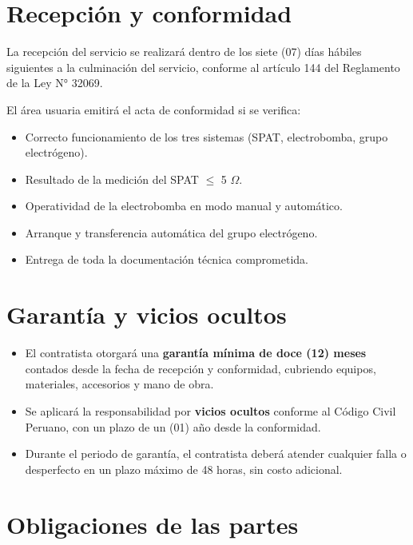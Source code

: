 \documentclass[12pt,a4paper]{article}
\begin{document}
\section{Recepción y conformidad}

La recepción del servicio se realizará dentro de los siete (07) días hábiles siguientes a la culminación del servicio, conforme al artículo 144 del Reglamento de la Ley N° 32069.

El área usuaria emitirá el acta de conformidad si se verifica:

\begin{itemize}
  \item Correcto funcionamiento de los tres sistemas (SPAT, electrobomba, grupo electrógeno).
  \item Resultado de la medición del SPAT $\leq$ 5 $\Omega$.
  \item Operatividad de la electrobomba en modo manual y automático.
  \item Arranque y transferencia automática del grupo electrógeno.
  \item Entrega de toda la documentación técnica comprometida.
\end{itemize}

\section{Garantía y vicios ocultos}

\begin{itemize}
  \item El contratista otorgará una \textbf{garantía mínima de doce (12) meses} contados desde la fecha de recepción y conformidad, cubriendo equipos, materiales, accesorios y mano de obra.
  \item Se aplicará la responsabilidad por \textbf{vicios ocultos} conforme al Código Civil Peruano, con un plazo de un (01) año desde la conformidad.
  \item Durante el periodo de garantía, el contratista deberá atender cualquier falla o desperfecto en un plazo máximo de 48 horas, sin costo adicional.
\end{itemize}

\section{Obligaciones de las partes}
\end{document}
